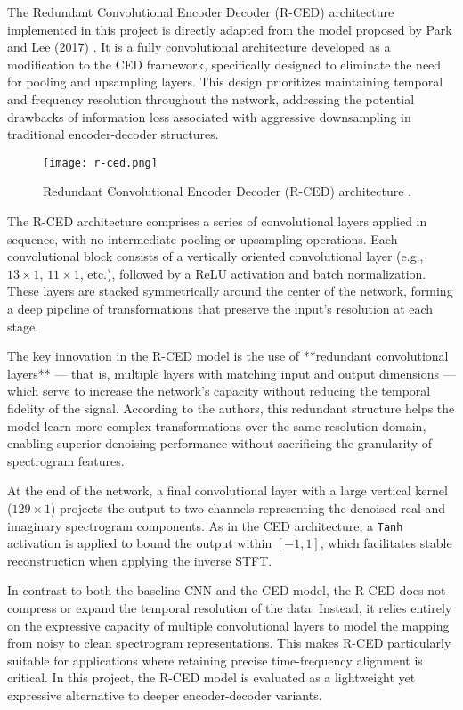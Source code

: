 The Redundant Convolutional Encoder Decoder (R-CED) architecture implemented in this project is directly adapted from the model proposed by Park and Lee (2017) \cite{park2017acoustic}. It is a fully convolutional architecture developed as a modification to the CED framework, specifically designed to eliminate the need for pooling and upsampling layers. This design prioritizes maintaining temporal and frequency resolution throughout the network, addressing the potential drawbacks of information loss associated with aggressive downsampling in traditional encoder-decoder structures.

\begin{figure}[h]
    \centering
    \texttt{[image: r-ced.png]}
    \caption{\label{fig:rced}Redundant Convolutional Encoder Decoder (R-CED) architecture \cite{park2017acoustic}.}
\end{figure}

The R-CED architecture comprises a series of convolutional layers applied in sequence, with no intermediate pooling or upsampling operations. Each convolutional block consists of a vertically oriented convolutional layer (e.g., \(13 \times 1\), \(11 \times 1\), etc.), followed by a ReLU activation and batch normalization. These layers are stacked symmetrically around the center of the network, forming a deep pipeline of transformations that preserve the input's resolution at each stage.

The key innovation in the R-CED model is the use of **redundant convolutional layers** — that is, multiple layers with matching input and output dimensions — which serve to increase the network’s capacity without reducing the temporal fidelity of the signal. According to the authors, this redundant structure helps the model learn more complex transformations over the same resolution domain, enabling superior denoising performance without sacrificing the granularity of spectrogram features.

At the end of the network, a final convolutional layer with a large vertical kernel (\(129 \times 1\)) projects the output to two channels representing the denoised real and imaginary spectrogram components. As in the CED architecture, a \texttt{Tanh} activation is applied to bound the output within \([-1, 1]\), which facilitates stable reconstruction when applying the inverse STFT.

In contrast to both the baseline CNN and the CED model, the R-CED does not compress or expand the temporal resolution of the data. Instead, it relies entirely on the expressive capacity of multiple convolutional layers to model the mapping from noisy to clean spectrogram representations. This makes R-CED particularly suitable for applications where retaining precise time-frequency alignment is critical. In this project, the R-CED model is evaluated as a lightweight yet expressive alternative to deeper encoder-decoder variants.

